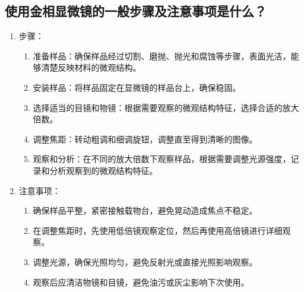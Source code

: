 \documentclass[a4paper,utf8]{article}
\begin{document}
    \subsection{使用金相显微镜的一般步骤及注意事项是什么？}
        \begin{enumerate}
            \item 步骤：\par
                \begin{enumerate}
                    \item 准备样品：确保样品经过切割、磨抛、抛光和腐蚀等步骤，表面光洁，能够清楚反映材料的微观结构。
                    \item 安装样品：将样品固定在显微镜的样品台上，确保稳固。
                    \item 选择适当的目镜和物镜：根据需要观察的微观结构特征，选择合适的放大倍数。
                    \item 调整焦距：转动粗调和细调旋钮，调整直至得到清晰的图像。
                    \item 观察和分析：在不同的放大倍数下观察样品，根据需要调整光源强度，记录和分析观察到的微观结构特征。
                \end{enumerate}
            \item 注意事项：\par
                \begin{enumerate}
                    \item 确保样品平整，紧密接触载物台，避免晃动造成焦点不稳定。
                    \item 在调整焦距时，先使用低倍镜观察定位，然后再使用高倍镜进行详细观察。
                    \item 调整光源，确保光照均匀，避免反射光或直接光照影响观察。
                    \item 观察后应清洁物镜和目镜，避免油污或灰尘影响下次使用。
                \end{enumerate}
        \end{enumerate}
\end{document}
